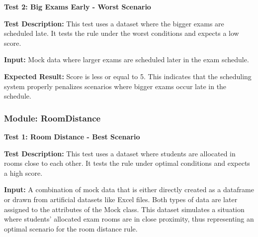 \vspace{\baselineskip}

 
 \textbf{Test 2: Big Exams Early - Worst Scenario}


\vspace{\baselineskip}

 
 \textbf{Test Description:}
This test uses a dataset where the bigger exams are scheduled late. It tests the
rule under the worst conditions and expects a low score.


\vspace{\baselineskip}


 \textbf{Input:}
 Mock data where larger exams are scheduled later in the exam schedule.


\vspace{\baselineskip}

 
 \textbf{Expected Result:}
 Score is less or equal to 5. This indicates that the scheduling system properly
penalizes scenarios where bigger exams occur late in the schedule.


\vspace{\baselineskip}



 \subsubsection{Module: RoomDistance}

 
\vspace{\baselineskip}


 
 \textbf{Test 1: Room Distance - Best Scenario}


\vspace{\baselineskip}

 
 \textbf{Test Description:}
 This test uses a dataset where students are allocated in rooms close to each
other. It tests the rule under optimal conditions and expects a high score.


\vspace{\baselineskip}


 \textbf{Input:}
A combination of mock data that is either directly created as a dataframe or drawn from
artificial datasets like Excel files. Both types of data are later assigned to the attributes of the
Mock class. This dataset simulates a situation where students' allocated exam rooms are in close
proximity, thus representing an optimal scenario for the room distance rule.

\vspace{\baselineskip}

